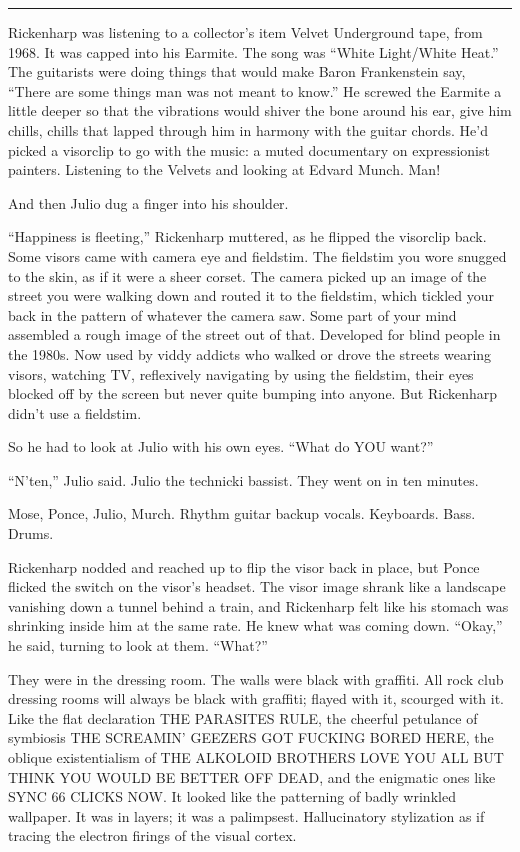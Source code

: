 \fancybreak{* * *}

Rickenharp was listening to a collector's item Velvet Underground tape, from 1968. It was capped into his Earmite. The song was ``White Light/White Heat.'' The guitarists were doing things that would make Baron Frankenstein say, ``There are some things man was not meant to know.'' He screwed the Earmite a little deeper so that the vibrations would shiver the bone around his ear, give him chills, chills that lapped through him in harmony with the guitar chords. He'd picked a visorclip to go with the music: a muted documentary on expressionist painters. Listening to the Velvets and looking at Edvard Munch. Man!

And then Julio dug a finger into his shoulder.

``Happiness is fleeting,'' Rickenharp muttered, as he flipped the visorclip back. Some visors came with camera eye and fieldstim. The fieldstim you wore snugged to the skin, as if it were a sheer corset. The camera picked up an image of the street you were walking down and routed it to the fieldstim, which tickled your back in the pattern of whatever the camera saw. Some part of your mind assembled a rough image of the street out of that. Developed for blind people in the 1980s. Now used by viddy addicts who walked or drove the streets wearing visors, watching TV, reflexively navigating by using the fieldstim, their eyes blocked off by the screen but never quite bumping into anyone. But Rickenharp didn't use a fieldstim.

So he had to look at Julio with his own eyes. ``What do YOU want?''

``N'ten,'' Julio said. Julio the technicki bassist. They went on in ten minutes.

Mose, Ponce, Julio, Murch. Rhythm guitar backup vocals. Keyboards. Bass. Drums.

Rickenharp nodded and reached up to flip the visor back in place, but Ponce flicked the switch on the visor's headset. The visor image shrank like a landscape vanishing down a tunnel behind a train, and Rickenharp felt like his stomach was shrinking inside him at the same rate. He knew what was coming down. ``Okay,'' he said, turning to look at them. ``What?''

They were in the dressing room. The walls were black with graffiti. All rock club dressing rooms will always be black with graffiti; flayed with it, scourged with it. Like the flat declaration THE PARASITES RULE, the cheerful petulance of symbiosis THE SCREAMIN' GEEZERS GOT FUCKING BORED HERE, the oblique existentialism of THE ALKOLOID BROTHERS LOVE YOU ALL BUT THINK YOU WOULD BE BETTER OFF DEAD, and the enigmatic ones like SYNC 66 CLICKS NOW. It looked like the patterning of badly wrinkled wallpaper. It was in layers; it was a palimpsest. Hallucinatory stylization as if tracing the electron firings of the visual cortex.

